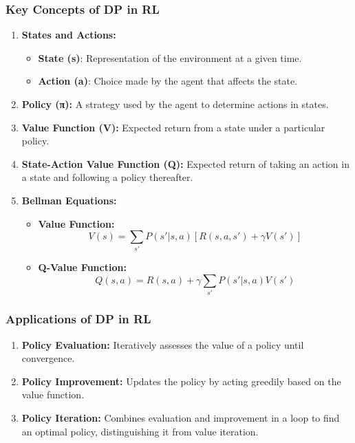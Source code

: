 \documentclass[aspectratio=169]{beamer}
\begin{document}
\begin{frame}[fragile]
  \frametitle{Key Concepts of DP in RL}
  
  \begin{enumerate}
    \item \textbf{States and Actions:}
      \begin{itemize}
        \item \textbf{State (s)}: Representation of the environment at a given time.
        \item \textbf{Action (a)}: Choice made by the agent that affects the state.
      \end{itemize}
  
    \item \textbf{Policy (π):} A strategy used by the agent to determine actions in states.
    
    \item \textbf{Value Function (V):} Expected return from a state under a particular policy.
    
    \item \textbf{State-Action Value Function (Q):} Expected return of taking an action in a state and following a policy thereafter.
    
    \item \textbf{Bellman Equations:} 
      \begin{itemize}
        \item \textbf{Value Function:}  
        \[
        V(s) = \sum_{s'} P(s' | s, a) \left[ R(s, a, s') + \gamma V(s') \right]
        \]

        \item \textbf{Q-Value Function:}  
        \[
        Q(s, a) = R(s, a) + \gamma \sum_{s'} P(s' | s, a) V(s')
        \]
      \end{itemize}
  \end{enumerate}
\end{frame}

\begin{frame}[fragile]
  \frametitle{Applications of DP in RL}
  
  \begin{enumerate}
    \item \textbf{Policy Evaluation:} Iteratively assesses the value of a policy until convergence.
    
    \item \textbf{Policy Improvement:} Updates the policy by acting greedily based on the value function.
    
    \item \textbf{Policy Iteration:} 
      Combines evaluation and improvement in a loop to find an optimal policy, distinguishing it from value iteration.
  \end{enumerate}
\end{frame}
\end{document}
